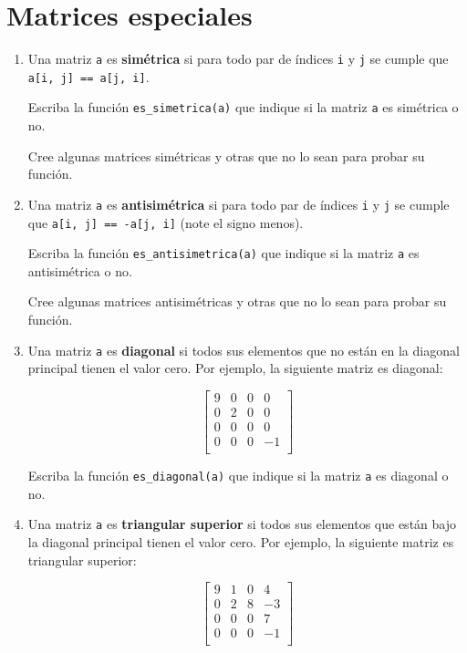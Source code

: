 \section{Matrices especiales}

\begin{enumerate}
\item
  Una matriz \lstinline!a! es \textbf{simétrica} si para todo par de
  índices \lstinline!i! y \lstinline!j! se cumple que
  \lstinline!a[i, j] == a[j, i]!.

  Escriba la función \lstinline!es_simetrica(a)! que indique si la
  matriz \lstinline!a! es simétrica o no.

  Cree algunas matrices simétricas y otras que no lo sean para probar su
  función.
\item
  Una matriz \lstinline!a! es \textbf{antisimétrica} si para todo par de
  índices \lstinline!i! y \lstinline!j! se cumple que
  \lstinline!a[i, j] == -a[j, i]! (note el signo menos).

  Escriba la función \lstinline!es_antisimetrica(a)! que indique si la
  matriz \lstinline!a! es antisimétrica o no.

  Cree algunas matrices antisimétricas y otras que no lo sean para
  probar su función.
\item
  Una matriz \lstinline!a! es \textbf{diagonal} si todos sus elementos
  que no están en la diagonal principal tienen el valor cero. Por
  ejemplo, la siguiente matriz es diagonal:

  \[\begin{bmatrix}
  9 & 0 & 0 & 0 \\
  0 & 2 & 0 & 0 \\
  0 & 0 & 0 & 0 \\
  0 & 0 & 0 & -1 \\
  \end{bmatrix}\]

  Escriba la función \lstinline!es_diagonal(a)! que indique si la matriz
  \lstinline!a! es diagonal o no.
\item
  Una matriz \lstinline!a! es \textbf{triangular superior} si todos sus
  elementos que están bajo la diagonal principal tienen el valor cero.
  Por ejemplo, la siguiente matriz es triangular superior:

  \[\begin{bmatrix}
  9 & 1 & 0 & 4 \\
  0 & 2 & 8 & -3 \\
  0 & 0 & 0 & 7 \\
  0 & 0 & 0 & -1 \\
  \end{bmatrix}\]


\end{enumerate}
